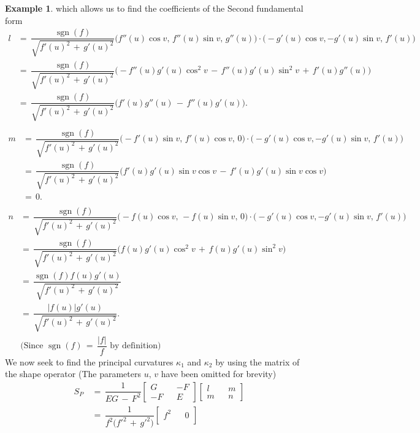 \documentclass{UKZNcomp}
\theoremstyle{definition}
\newtheorem{example}[definition]{Example}
\DeclareMathOperator{\sgn}{sgn}
\theoremstyle{remark}
\begin{document}
\begin{example}
which allows us to find the coefficients of the Second fundamental form
\begin{align*}
l &=\,\dfrac{\sgn(f)}{\sqrt{f'(u)^2\,+\,g'(u)^2}}\Big(f''(u)\cos v,\,f''(u)\sin v,\,g''(u)\Big)\cdot\Big(-g'(u)\cos v,-g'(u)\sin v,\,f'(u)\Big)\\
&=\,\dfrac{\sgn(f)}{\sqrt{f'(u)^2\,+\,g'(u)^2}}\Big(-f''(u)g'(u)\cos^2v\,-\,f''(u)g'(u)\sin^2v\,+\,f'(u)g''(u)\Big)\\
&=\,\dfrac{\sgn(f)}{\sqrt{f'(u)^2\,+\,g'(u)^2}}\Big(f'(u)g''(u)\,-\,f''(u)g'(u)\Big).\\
\end{align*}
\begin{align*}
m&=\,\dfrac{\sgn(f)}{\sqrt{f'(u)^2\,+\,g'(u)^2}}\Big(-f'(u)\sin v,\,f'(u)\cos v,\,0\Big)\cdot\Big(-g'(u)\cos v,-g'(u)\sin v,\,f'(u)\Big)\\
&=\,\dfrac{\sgn(f)}{\sqrt{f'(u)^2\,+\,g'(u)^2}}\Big( f'(u)g'(u)\sin v\cos v\,-\,f'(u)g'(u)\sin v\cos v \Big)\\
&=\,0.\\
\end{align*}
\begin{align*}
n&=\,\dfrac{\sgn(f)}{\sqrt{f'(u)^2\,+\,g'(u)^2}}\Big(-f(u)\cos v,\,-f(u)\sin v,\,0 \Big)\cdot\Big(-g'(u)\cos v,-g'(u)\sin v,\,f'(u)\Big)\\
&=\,\dfrac{\sgn(f)}{\sqrt{f'(u)^2\,+\,g'(u)^2}}\Big( f(u)g'(u)\cos^2v\,+\,f(u)g'(u)\sin^2v \Big)\\
&=\,\dfrac{\sgn(f)f(u)g'(u)}{\sqrt{f'(u)^2\,+\,g'(u)^2}}\\
&=\,\dfrac{\lvert f(u) \rvert g'(u)}{\sqrt{f'(u)^2\,+\,g'(u)^2}}.\\
&\Big(\text{Since}\,\,\sgn(f)\,=\,\dfrac{\lvert f \rvert}{f}\,\,\text{by definition} \Big)
\end{align*}
We now seek to find the principal curvatures $\kappa_1$ and $\kappa_2$ by using the matrix of the shape operator (The parameters $u,\,v$ have been omitted for brevity)
\begin{align*}
S_P\,&=\, \dfrac{1}{EG\,-\,F^2}
\begin{bmatrix}
G && -F\\
-F && E
\end{bmatrix}
\begin{bmatrix}
l && m\\
m && n
\end{bmatrix}\\
&=\,\dfrac{1}{f^2\big(f'^2\,+\,g'^2\big)}
\begin{bmatrix}
f^2 && 0\\

\end{bmatrix}
\end{align*}
\end{example}
\end{document}
